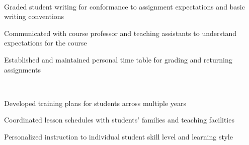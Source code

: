 \documentclass[]{deedy-resume-openfont}
\begin{document}
\begin{minipage}[t]{0.66\textwidth}
\begin{tightemize}
\end{tightemize}
\sectionsep
\sectionsep
\sectionsep
{} 
\sectionsep\\
\begin{tightemize}
	\item Graded student writing for conformance to assignment expectations and basic writing conventions
	\item Communicated with course professor and teaching assistants to understand expectations for the course
	\item Established and maintained personal time table for grading and returning assignments
\end{tightemize}
\sectionsep
\sectionsep
\sectionsep
{} 
\sectionsep\\
\begin{tightemize}
	\item Developed training plans for students across multiple years
	\item Coordinated lesson schedules with students' families and teaching facilities
	\item Personalized instruction to individual student skill level and learning style
\end{tightemize}
\sectionsep



\end{minipage} 
\end{document}
